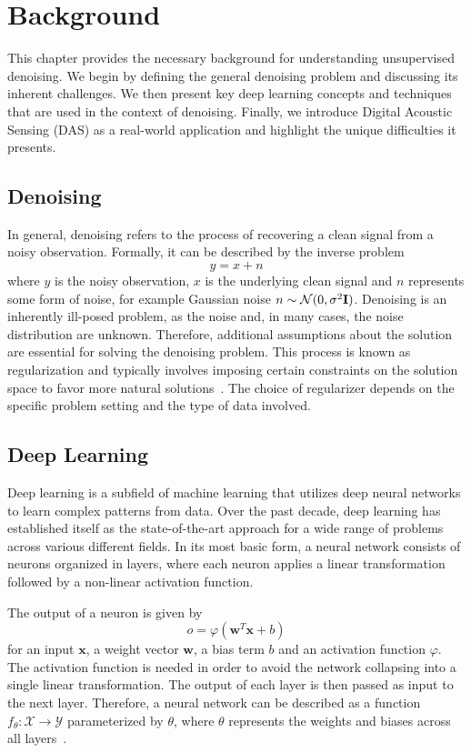 \chapter{Background}\label{ch:background}

This chapter provides the necessary background for understanding unsupervised denoising.
We begin by defining the general denoising problem and discussing its inherent challenges.
We then present key deep learning concepts and techniques that are used in the context of denoising.
Finally, we introduce Digital Acoustic Sensing (DAS) as a real-world application and highlight the unique difficulties 
it presents.

\section{Denoising}

In general, denoising refers to the process of recovering a clean signal from a noisy observation.
Formally, it can be described by the inverse problem 
\begin{equation}
    y = x + n
\end{equation}
where $y$ is the noisy observation, $x$ is the underlying clean signal and $n$ represents some form of noise, for
example Gaussian noise $n \sim \mathcal{N}(0,\sigma^2\mathbf{I})$.
Denoising is an inherently ill-posed problem, as the noise and, in many cases, the noise distribution are unknown.
Therefore, additional assumptions about the solution are essential for solving the denoising problem. 
This process is known as regularization and typically involves imposing certain constraints on the solution space to 
favor more natural solutions~\cite{XXX}. 
The choice of regularizer depends on the specific problem setting and the type of data involved.

\section{Deep Learning}

Deep learning is a subfield of machine learning that utilizes deep neural networks to learn complex patterns from data. 
Over the past decade, deep learning has established itself as the state-of-the-art approach for a wide range of problems
across various different fields. 
In its most basic form, a neural network consists of neurons organized in layers, where each neuron applies a linear 
transformation followed by a non-linear activation function.

The output of a neuron is given by
\begin{equation}
    o = \varphi(\mathbf{w}^T\mathbf{x} + b)
\end{equation}
for an input $\mathbf{x}$, a weight vector $\mathbf{w}$, a bias term $b$ and an activation function $\varphi$. 
The activation function is needed in order to avoid the network collapsing into a single linear transformation. 
The output of each layer is then passed as input to the next layer. 
Therefore, a neural network can be described as a function $f_{\theta}: \mathcal{X} \rightarrow \mathcal{Y}$ 
parameterized by $\theta$, where $\theta$ represents the weights and biases across all layers~\cite{DeepLearning}.

